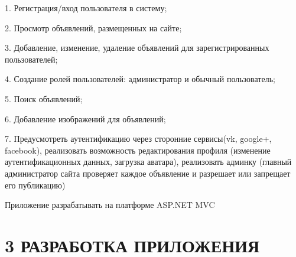 \documentclass[14pt,a4paper]{extreport}
\begin{document}
	\hspace{2ex}1. Регистрация/вход пользователя в систему;

	\hspace{2ex}2. Просмотр объявлений, размещенных на сайте;

	\hspace{2ex}3. Добавление, изменение, удаление объявлений для зарегистрированных пользователей;

	\hspace{2ex}4. Создание ролей пользователей: администратор и обычный пользователь;

	\hspace{2ex}5. Поиск объявлений;

	\hspace{2ex}6. Добавление изображений для объявлений;\par

          	\hspace{2ex}7. Предусмотреть аутентификацию через сторонние сервисы(vk, google+, facebook),  реализовать возможность редактирования профиля (изменение аутентификационных данных, загрузка аватара), реализовать админку (главный администратор сайта проверяет каждое объявление и разрешает или запрещает его публикацию) \par 
	 Приложение разрабатывать на платформе ASP.NET MVC\par

	\newpage
	\section*{\normalsize\hspace{4ex}3 РАЗРАБОТКА ПРИЛОЖЕНИЯ}
\end{document}
